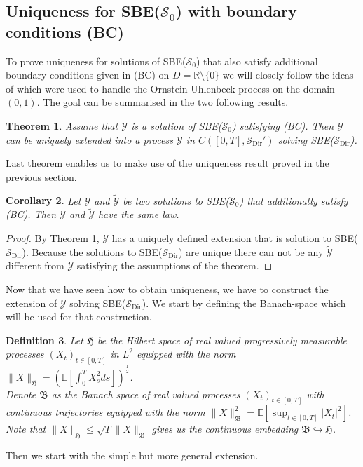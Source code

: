 \documentclass[a4paper, reqno, 12pt]{amsart}
\theoremstyle{plain}
\newtheorem{definition}{Definition}[section]
\newtheorem{theorem}[definition]{Theorem}
\newtheorem{corollary}[definition]{Corollary}
\theoremstyle{definition}
\newcommand{\R}{\mathbb{R}}
\newcommand{\Sdir}{\mathcal{S}_{\text{Dir}}}
\begin{document}
\subsection{Uniqueness for SBE($\mathcal S_0$) with boundary conditions (BC)} 
\label{sec:uniqunessS0} 

To prove uniqueness for solutions of SBE($\mathcal S_0$) that also satisfy additional boundary conditions  given in (BC) on $D=\R\setminus \{0\}$ we will closely follow the ideas of \cite{BGJS22} which were used to handle the Ornstein-Uhlenbeck process on the domain $(0,1)$. The goal can be summarised in the two following results. 

\begin{theorem} 
\label{thm:sdirextension}
Assume that $\mathcal Y$ is a solution of SBE($\mathcal S_0$) satisfying (BC). Then $\mathcal Y$ can be uniquely extended into a process $\mathcal Y$ in $C([0,T],\Sdir')$ solving SBE($\Sdir$). 
\end{theorem}

Last theorem enables us to make use of the uniqueness result proved in the previous section.

\begin{corollary}
 \label{cor:S0unique}
Let $\mathcal{Y}$ and $\tilde{\mathcal{Y}}$ be two solutions to SBE($\mathcal S_0$) that additionally satisfy (BC). Then $\mathcal{Y}$ and $\tilde{\mathcal{Y}}$ have the same law.
\end{corollary}
\begin{proof}
 By Theorem \ref{thm:sdirextension}, $\mathcal Y$ has a uniquely defined extension that is solution to SBE($\Sdir$). Because the solutions to SBE($\Sdir$) are unique there can not be any $\tilde{\mathcal{Y}}$ different from $\mathcal Y$ satisfying the assumptions of the theorem. 
\end{proof}

Now that we have seen how to obtain uniqueness, we have to construct the extension of $\mathcal Y$ solving SBE($\Sdir$). We start by defining the Banach-space which will be used for that construction.

\begin{definition}
    Let $\mathfrak H$ be the Hilbert space of real valued progressively measurable processes $(X_t)_{t\in[0,T]}$ in $L^2$ equipped with the norm $\|X\|_{\mathfrak H} = \left(\mathbb E \left[ \int_0^T X_s^2 ds\right]\right)^{\frac{1}{2}}$.\\
    Denote $\mathfrak B$ as the Banach space of real valued processes $(X_t)_ {t\in[0,T]}$ with continuous trajectories equipped with the norm $\|X\|^2_{\mathfrak B} = \mathbb E\left[\sup_{t\in[0,T]} |X_t|^2 \right]$. Note that $\|X\|_{\mathfrak H} \leq \sqrt{T}\|X\|_{\mathfrak B}$ gives us the continuous embedding $\mathfrak B \hookrightarrow \mathfrak H$.
\end{definition}
Then we start with the simple but more general extension.
\end{document}
